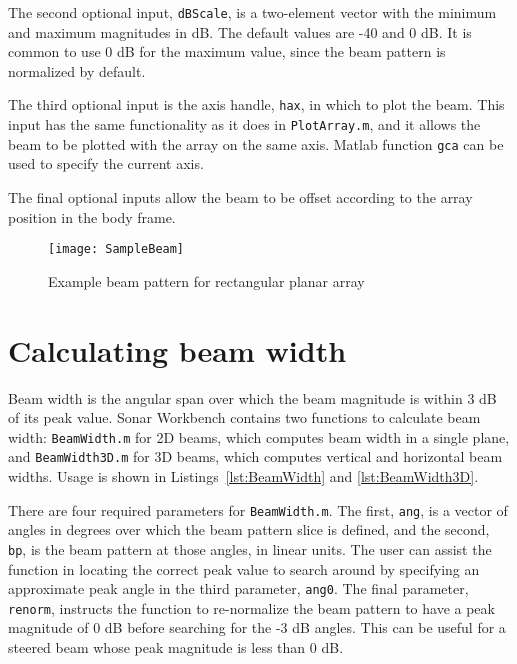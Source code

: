 The second optional input, \texttt{dBScale}, is a two-element vector with the minimum and maximum magnitudes in dB. The default values are -40 and 0 dB. It is common to use 0 dB for the maximum value, since the beam pattern is normalized by default.

The third optional input is the axis handle, \texttt{hax}, in which to plot the beam. This input has the same functionality as it does in \texttt{PlotArray.m}, and it allows the beam to be plotted with the array on the same axis. Matlab function \texttt{gca} can be used to specify the current axis.

The final optional inputs allow the beam to be offset according to the array position in the body frame. 



\clearpage
\begin{sidewaysfigure}[!ht]
\begin{center}
\texttt{[image: SampleBeam]}
\caption{\label{fig:SampleBeam}Example beam pattern for rectangular planar array}
\end{center}
\end{sidewaysfigure}

\clearpage
\section{Calculating beam width}

Beam width is the angular span over which the beam magnitude is within 3 dB of its peak value. Sonar Workbench contains two functions to calculate beam width: \texttt{BeamWidth.m} for 2D beams, which computes beam width in a single plane, and \texttt{BeamWidth3D.m} for 3D beams, which computes vertical and horizontal beam widths. Usage is shown in Listings~\ref{lst:BeamWidth} and \ref{lst:BeamWidth3D}.





There are four required parameters for \texttt{BeamWidth.m}. The first, \texttt{ang}, is a vector of angles in degrees over which the beam pattern slice is defined, and the second, \texttt{bp}, is the beam pattern at those angles, in linear units. The user can assist the function in locating the correct peak value to search around by specifying an approximate peak angle in the third parameter, \texttt{ang0}. The final parameter, \texttt{renorm}, instructs the function to re-normalize the beam pattern to have a peak magnitude of 0 dB before searching for the -3 dB angles. This can be useful for a steered beam whose peak magnitude is less than 0 dB. 

